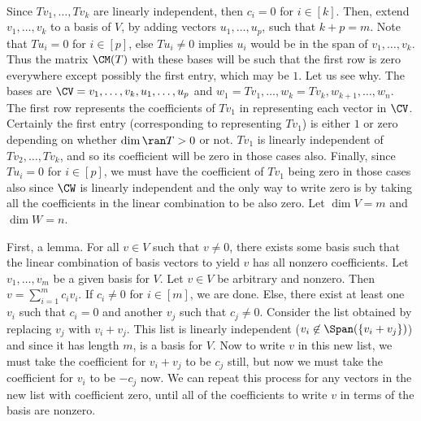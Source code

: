 \documentclass{book}
\begin{document}
\begin{enumerate}[label=\arabic*)]
\begin{align*}
      \end{align*}
      Since $Tv_1, \dots, Tv_k$ are linearly independent, then $c_i = 0$ for $i \in [k]$. Then, extend $v_1, \dots, v_k$ to a basis of $V$, by adding vectors $u_1, \dots, u_p$, such that $k
      + p = m$. Note that $Tu_i = 0$ for $i \in [p]$, else $Tu_i \neq 0$ implies $u_i$ would be in the span of $v_1, \dots, v_k$. Thus the matrix $\CM(T)$ with these bases will be such that
      the first row is zero everywhere except possibly the first entry, which may be $1$. Let us see why. The bases are $\CV = v_1, \dots, v_k, u_1, \dots, u_p$ and $w_1 = Tv_1, \dots, w_k =
      Tv_k, w_{k + 1}, \dots, w_n$. The first row represents the coefficients of $Tv_1$ in representing each vector in $\CV$. Certainly the first entry (corresponding to representing $Tv_1$)
      is either $1$ or zero depending on whether $\dim\ran T > 0$ or not. $Tv_1$ is linearly independent of $Tv_2, \dots, Tv_k$, and so its coefficient will be zero in those cases also.
      Finally, since $Tu_i = 0$ for $i \in [p]$, we must have the coefficient of $Tv_1$ being zero in those cases also since $\CW$ is linearly independent and the only way to write zero is
      by taking all the coefficients in the linear combination to be also zero.
    \ii
      Let $\dim V = m$ and $\dim W = n$. 

      First, a lemma. For all $v \in V$ such that $v \neq 0$, there exists some basis such that the linear combination of basis vectors to yield $v$ has all nonzero coefficients. Let $v_1,
      \dots, v_m$ be a given basis for $V$. Let $v \in V$ be arbitrary and nonzero. Then $v = \sum_{i = 1}^{m}c_iv_i$. If $c_i \neq 0$ for $i \in [m]$, we are done. Else, there exist at
      least one $v_i$ such that $c_i = 0$ and another $v_j$ such that $c_j \neq 0$. Consider the list obtained by replacing $v_j$ with $v_i + v_j$. This list is linearly independent ($v_i
      \not\in \Span(\{v_i + v_j\})$) and since it has length $m$, is a basis for $V$. Now to write $v$ in this new list, we must take the coefficient for $v_i + v_j$ to be $c_j$ still, but
      now we must take the coefficient for $v_i$ to be $-c_j$ now. We can repeat this process for any vectors in the new list with coefficient zero, until all of the coefficients to write
      $v$ in terms of the basis are nonzero.


\end{enumerate}
\end{document}
